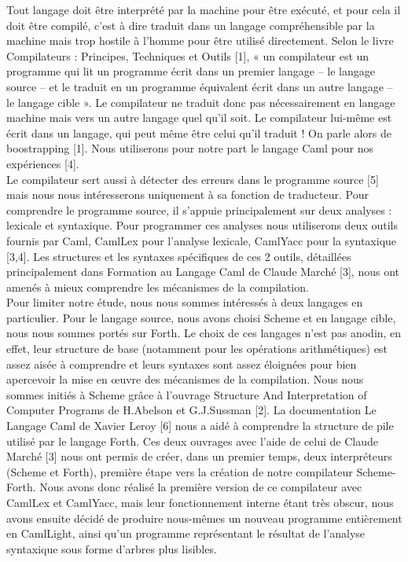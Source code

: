 \documentclass{report}
\begin{document}
Tout langage doit être interprété par la machine pour être exécuté, et pour cela il doit être compilé, c'est à dire traduit dans un langage compréhensible par la machine mais trop hostile à l'homme pour être utilisé directement. Selon le livre Compilateurs : Principes, Techniques et Outils [1], « un compilateur est un programme qui lit un programme écrit dans un premier langage – le langage source – et le traduit en un programme équivalent écrit dans un autre langage – le langage cible ». Le compilateur ne traduit donc pas nécessairement en langage machine mais vers un autre langage quel qu'il soit. Le compilateur lui-même est écrit dans un langage, qui peut même être celui qu'il traduit ! On
parle alors de boostrapping [1]. Nous utiliserons pour notre part le langage Caml pour nos expériences [4].
\\
\indent
Le compilateur sert aussi à détecter des erreurs dans le programme source
[5] mais nous nous intéresserons uniquement à sa fonction de traducteur.
Pour comprendre le programme source, il s'appuie principalement sur deux analyses : lexicale et syntaxique. Pour programmer ces analyses nous utiliserons deux outils fournis par Caml, CamlLex pour l'analyse lexicale, CamlYacc pour la syntaxique [3,4]. Les structures et les syntaxes spécifiques de ces 2 outils, détaillées principalement dans Formation au Langage Caml de Claude Marché [3], nous ont amenés à mieux comprendre les mécanismes de la compilation. 
\\
\indent
Pour limiter notre étude, nous nous sommes intéressés à deux langages en particulier. Pour le langage source, nous avons choisi Scheme et en langage cible, nous nous sommes portés sur Forth. Le choix de ces langages n'est pas anodin, en effet, leur structure de base (notamment pour les opérations arithmétiques) est assez aisée à comprendre et leurs syntaxes sont assez éloignées pour bien apercevoir la mise en œuvre des mécanismes de la
compilation. Nous nous sommes initiés à Scheme grâce à l'ouvrage Structure And
Interpretation of Computer Programs de H.Abelson et G.J.Sussman [2]. La documentation Le Langage Caml de Xavier Leroy [6] nous a aidé à comprendre la structure de pile utilisé par le langage Forth. Ces deux ouvrages avec l'aide de celui de Claude Marché [3] nous ont permis de créer, dans un premier temps, deux interpréteurs (Scheme et Forth), première étape vers la création de notre compilateur Scheme-Forth. Nous avons donc réalisé la première version de ce compilateur avec CamlLex et CamlYacc, mais leur fonctionnement interne étant très obscur, nous avons ensuite décidé de produire nous-mêmes un nouveau programme entièrement en CamlLight, ainsi qu'un programme représentant le résultat de l'analyse syntaxique sous forme d'arbres plus lisibles.
\end{document}
